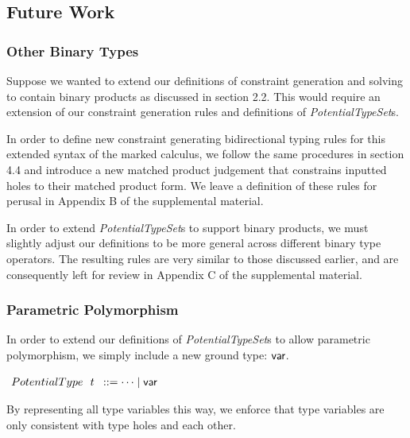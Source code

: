 \subsection{Future Work}
\subsubsection{Other Binary Types}
Suppose we wanted to extend our definitions of constraint generation and solving to contain binary products as discussed in section 2.2. This would require an extension of our constraint generation rules and definitions of \emph{PotentialTypeSet}s. 

In order to define new constraint generating bidirectional typing rules for this extended syntax of the marked calculus, we follow the same procedures in section 4.4 and introduce a new matched product judgement that constrains inputted holes to their matched product form. We leave a definition of these rules for perusal in Appendix B of the supplemental material.

In order to extend \emph{PotentialTypeSet}s to support binary products, we must slightly adjust our definitions to be more general across different binary type operators. The resulting rules are very similar to those discussed earlier, and are consequently left for review in Appendix C of the supplemental material.

\subsubsection{Parametric Polymorphism}
In order to extend our definitions of \emph{PotentialTypeSet}s to allow parametric polymorphism, we simply include a new ground type: ${\normalfont\textsf{var}}$.
\begin{center}
$\arraycolsep=4pt\begin{array}{lll}
PotentialType~~ t & ::= 
  \dots \mid \TVar
\end{array}$
\end{center}
By representing all type variables this way, we enforce that type variables are only consistent with type holes and each other. 

